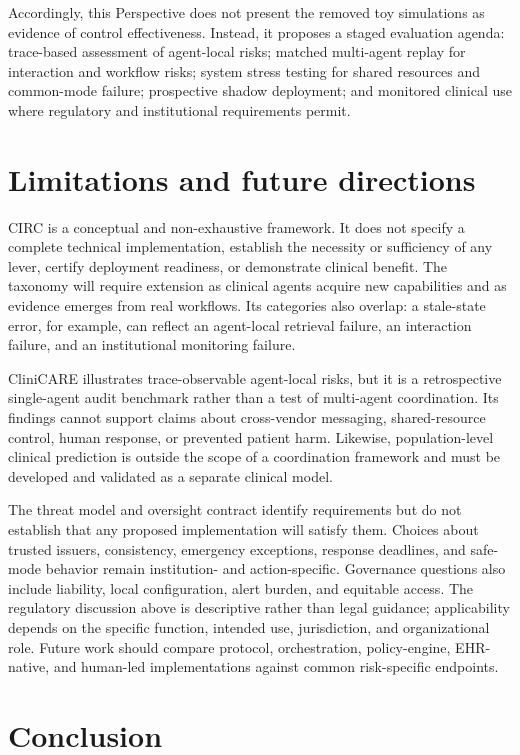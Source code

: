 \documentclass[10pt]{article}
\begin{document}
Accordingly, this Perspective does not present the removed toy simulations as evidence of control
effectiveness. Instead, it proposes a staged evaluation agenda: trace-based assessment of agent-local
risks; matched multi-agent replay for interaction and workflow risks; system stress testing for shared
resources and common-mode failure; prospective shadow deployment; and monitored clinical use where
regulatory and institutional requirements permit.

\section{Limitations and future directions}

CIRC is a conceptual and non-exhaustive framework. It does not specify a complete technical
implementation, establish the necessity or sufficiency of any lever, certify deployment readiness, or
demonstrate clinical benefit. The taxonomy will require extension as clinical agents acquire new
capabilities and as evidence emerges from real workflows. Its categories also overlap: a stale-state
error, for example, can reflect an agent-local retrieval failure, an interaction failure, and an
institutional monitoring failure.

CliniCARE illustrates trace-observable agent-local risks, but it is a retrospective single-agent audit
benchmark rather than a test of multi-agent coordination. Its findings cannot support claims about
cross-vendor messaging, shared-resource control, human response, or prevented patient harm. Likewise,
population-level clinical prediction is outside the scope of a coordination framework and must be
developed and validated as a separate clinical model.

The threat model and oversight contract identify requirements but do not establish that any proposed
implementation will satisfy them. Choices about trusted issuers, consistency, emergency exceptions,
response deadlines, and safe-mode behavior remain institution- and action-specific. Governance
questions also include liability, local configuration, alert burden, and equitable access. The
regulatory discussion above is descriptive rather than legal guidance; applicability depends on the
specific function, intended use, jurisdiction, and organizational role. Future work should compare
protocol, orchestration, policy-engine, EHR-native, and human-led implementations against common
risk-specific endpoints.

\section{Conclusion}
\end{document}
